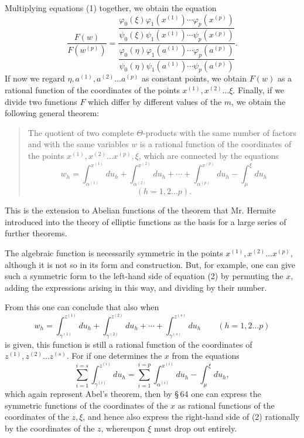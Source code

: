 \documentclass[10pt]{article}
\begin{document}
Multiplying equations (1) together, we obtain the equation
\[
\tag{2}
\frac{F(w)}{F(w^{(p)})}=\frac{
\dfrac{\varphi_0(\xi)\varphi_1(x^{(1)})\cdots\varphi_p(x^{(p)})}{\psi_0(\xi)\psi_1(x^{(1)})\cdots\psi_p(x^{(p)})}}
{\dfrac{\varphi_0(\eta)\varphi_1(a^{(1)})\cdots\varphi_p(a^{(p)})}{\psi_0(\eta)\psi_1(a^{(1)})\cdots\psi_p(a^{(p)})}}.
\]
If now we regard \(\eta,a^{(1)},a^{(2)}\ldots a^{(p)}\) as constant points, we obtain \(F(w)\) as a rational function of the coordinates of the points \(x^{(1)},x^{(2)}\ldots\xi\). Finally, if we divide two functions \(F\) which differ by different values of the \(m\), we obtain the following general theorem:

\begin{quote}
The quotient of two complete \(\Theta\)-products with the same number of factors and with the same variables \(w\) is a rational function of the coordinates of the points \(x^{(1)},x^{(2)}\ldots x^{(p)},\xi\), which are connected by the equations
\[
w_h=\int_{\alpha^{(1)}}^{x^{(1)}}du_h+
\int_{\alpha^{(2)}}^{x^{(2)}}du_h+\cdots+
\int_{\alpha^{(p)}}^{x^{(p)}}du_h-
\int_{\mu}^{\xi}du_h
\]
\[(h=1,2\ldots p).
\]
\end{quote}

This is the extension to Abelian functions of the theorem that Mr. Hermite introduced into the theory of elliptic functions as the basis for a large series of further theorems.

The algebraic function is necessarily symmetric in the points \(x^{(1)},x^{(2)}\ldots x^{(p)}\), although it is not so in its form and construction. But, for example, one can give such a symmetric form to the left-hand side of equation (2) by permuting the \(x\), adding the expressions arising in this way, and dividing by their number.

From this one can conclude that also when
\[
w_h=\int_{\gamma^{(1)}}^{z^{(1)}}du_h+
\int_{\gamma^{(2)}}^{z^{(2)}}du_h+\cdots+
\int_{\gamma^{(s)}}^{z^{(s)}}du_h\qquad(h=1,2\ldots p)
\]
is given, this function is still a rational function of the coordinates of \(z^{(1)},z^{(2)}\ldots z^{(s)}\). For if one determines the \(x\) from the equations
\[
\sum_{i=1}^{i=s}\int_{\gamma^{(i)}}^{z^{(i)}}du_h=\sum_{i=1}^{i=p}\int_{\alpha^{(i)}}^{x^{(i)}}du_h-\int_{\mu}^{\xi}du_h,
\]
which again represent Abel's theorem, then by \S\,64 one can express the symmetric functions of the coordinates of the \(x\) as rational functions of the coordinates of the \(z,\xi\), and hence also express the right-hand side of (2) rationally by the coordinates of the \(z\), whereupon \(\xi\) must drop out entirely.
\end{document}
